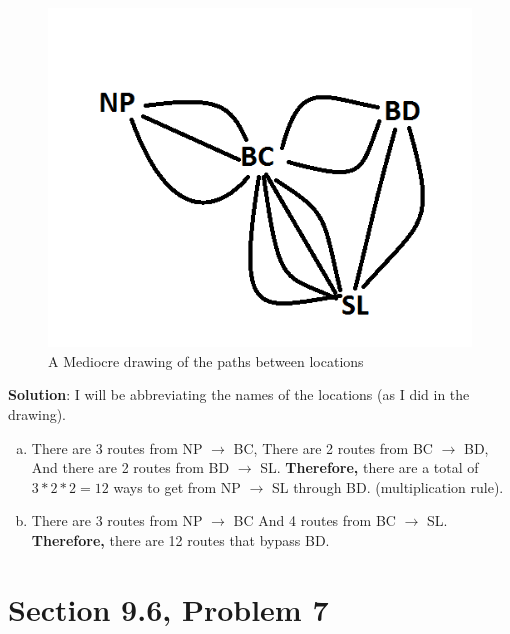 \documentclass{article}
\begin{document}
\begin{large}
\begin{figure}[h]
\includegraphics[scale = 0.7]{HW2Prob4-a}
\caption{A Mediocre drawing of the paths between locations}
\centering
\end{figure}

\textbf{Solution}: I will be abbreviating the names of the locations (as I did in the drawing).
\begin{enumerate}[(a)]
    \item There are 3 routes from NP $\rightarrow$ BC, 
        \newline There are 2 routes from BC $\rightarrow$ BD,
        \newline And there are 2 routes from BD $\rightarrow$ SL.
        \newline \textbf{Therefore,} there are a total of $3*2*2 
        = 12$ ways to get from NP $\rightarrow$ SL through BD. (multiplication rule).
        
    \item There are 3 routes from NP $\rightarrow$ BC 
        \newline And 4 routes from BC $\rightarrow$ SL.
        \newline \textbf{Therefore,} there are 12 routes that bypass BD.
\end{enumerate}

\clearpage
\header

\section*{Section 9.6, Problem 7}


\end{large}
\end{document}
